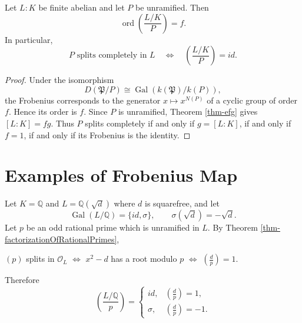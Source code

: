 \begin{proposition}\label{prop-orderFrob}
Let $L:K$ be finite abelian and let $P$ be unramified. Then
\[
\operatorname{ord}\left(\frac{L/K}{P}\right)=f.
\]
In particular,
\[
P \text{ splits completely in }L
\quad\Longleftrightarrow\quad
\left(\frac{L/K}{P}\right)=id.
\]
\end{proposition}

\begin{proof}
Under the isomorphism
\[
D(\mathfrak P/P)\cong \operatorname{Gal}(k(\mathfrak P)/k(P)),
\]
the Frobenius corresponds to the generator
$x\mapsto x^{N(P)}$ of a cyclic group of order $f$. Hence its order is $f$.
Since $P$ is unramified, Theorem \ref{thm-efg} gives $[L:K]=fg$. Thus $P$ splits
completely if and only if $g=[L:K]$, if and only if $f=1$, if and only if its Frobenius
is the identity.
\end{proof}

\section{Examples of Frobenius Map} \label{sec-frobeg}

\begin{example}\label{eg-quadraticFrob}
Let
\(K = \mathbb{Q}\) and \(L=\mathbb Q(\sqrt d)\)
where $d$ is squarefree, and let
\[
\operatorname{Gal}(L/\mathbb Q)=\{id,\sigma\},
\qquad \sigma(\sqrt d)=-\sqrt d.
\]
Let $p$ be an odd rational prime which is unramified in $L$. By Theorem \ref{thm-factorizationOfRationalPrimes}, 
\begin{center}
$(p)$ splits in $\mathcal O_L$ \quad $\Leftrightarrow$ \quad 
$x^2-d$ has a root modulo $p$ \quad $\Leftrightarrow$ \quad
\(\left(\frac d p\right)=1.
\)
\end{center}
Therefore
\[
\boxed{\left(\frac{L/\mathbb Q}{p}\right)
=
\begin{cases}
 id, & \left(\frac d p\right)=1,\\
 \sigma, & \left(\frac d p\right)=-1.
\end{cases}}
\]
\end{example}



